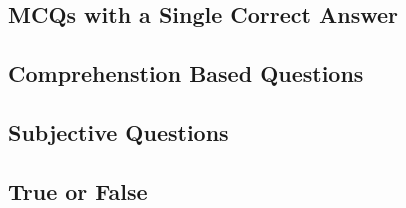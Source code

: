 \subsection*{MCQs with a Single Correct Answer}
\begin{enumerate}[label=\thesubsection.\arabic*,ref=\thesubsection.\theenumi]





\end{enumerate}
\subsection*{Comprehenstion Based Questions}
\begin{enumerate}[label=\thesubsection.\arabic*,ref=\thesubsection.\theenumi]




\end{enumerate}
\subsection*{Subjective Questions}
\begin{enumerate}[label=\thesubsection.\arabic*,ref=\thesubsection.\theenumi]





\end{enumerate}
\subsection*{True or False}
\begin{enumerate}[label=\thesubsection.\arabic*,ref=\thesubsection.\theenumi]




\end{enumerate}
